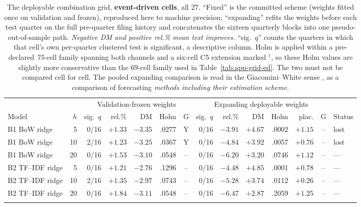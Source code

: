 \begin{table}[p]
\centering
\caption[The deployable combiner, event-driven cells]{The deployable
combination grid, \textbf{event-driven cells}, all 27. ``Fixed'' is the
committed scheme (weights fitted once on validation and frozen),
reproduced here to machine precision; ``expanding'' refits the weights
before each test quarter on the full pre-quarter filing history and
concatenates the sixteen quarterly blocks into one pseudo-out-of-sample
path. \emph{Negative DM and positive rel.\% mean text improves.} ``sig.\
$q$'' counts the quarters in which that cell's own per-quarter clustered
test is significant, a descriptive column. Holm is applied within a
pre-declared \emph{75}-cell family spanning both channels and a six-cell
C5 extension marked $^{\dagger}$, so these Holm values are slightly more
conservative than the 69-cell family used in Table~\ref{tab:app-grid-ed}.
The two must not be compared cell for cell. The pooled expanding
comparison is read in the Giacomini--White sense
\cite{giacominiwhite2006conditional}, as a comparison of
forecasting \emph{methods including their estimation scheme}.}
\label{tab:app-deploy-ed}
\singlespacing\footnotesize
\setlength{\tabcolsep}{3pt}
\begin{tabular}{@{}lrrrrrcrrrrrcl@{}}
\toprule
& & \multicolumn{5}{c}{Validation-frozen weights} & \multicolumn{6}{c}{Expanding deployable weights} & \\
\cmidrule(lr){3-7}\cmidrule(lr){8-13}
Model & $h$ & sig.\ $q$ & rel.\% & DM & Holm & G & sig.\ $q$ & rel.\% & DM & Holm & plac. & G & Status \\
\midrule
B1 BoW ridge&5&0/16&$+1.33$&$-3.35$& .0277 &Y&0/16&$-3.91$&$+4.67$& .0002 &$+1.15$&--&lost\\
B1 BoW ridge&10&2/16&$+1.23$&$-3.25$& .0367 &Y&0/16&$-4.84$&$+3.92$& .0057 &$+0.76$&--&lost\\
B1 BoW ridge&20&0/16&$+1.53$&$-3.10$& .0548 &--&0/16&$-6.20$&$+3.20$& .0746 &$+1.12$&--&---\\
\addlinespace
B2 TF--IDF ridge&5&0/16&$+1.21$&$-2.76$& .1296 &--&0/16&$-4.48$&$+4.85$& .0001 &$+0.78$&--&---\\
B2 TF--IDF ridge&10&2/16&$+1.35$&$-2.97$& .0743 &--&0/16&$-5.28$&$+3.74$& .0112 &$+0.26$&--&---\\
B2 TF--IDF ridge&20&0/16&$+1.84$&$-3.11$& .0548 &--&0/16&$-6.47$&$+2.87$& .2059 &$+1.25$&--&---\\
\addlinespace

\end{tabular}
\end{table}
